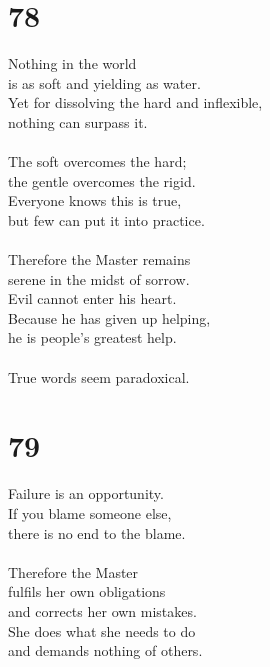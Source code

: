 \documentclass[b5paper, 12pt, oneside]{book}
\begin{document}
\chapter*{78}
Nothing in the world\\
is as soft and yielding as water.\\
Yet for dissolving the hard and inflexible,\\
nothing can surpass it.\\
\\
The soft overcomes the hard;\\
the gentle overcomes the rigid.\\
Everyone knows this is true,\\
but few can put it into practice.\\
\\
Therefore the Master remains\\
serene in the midst of sorrow.\\
Evil cannot enter his heart.\\
Because he has given up helping,\\
he is people's greatest help.\\
\\
True words seem paradoxical.

\chapter*{79}
Failure is an opportunity.\\
If you blame someone else,\\
there is no end to the blame.\\
\\
Therefore the Master\\
fulfils her own obligations\\
and corrects her own mistakes.\\
She does what she needs to do\\
and demands nothing of others.
\end{document}
